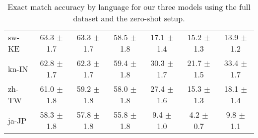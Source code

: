 \documentclass[11pt]{article}
\begin{document}
\begin{table*}[]
{\begin{tabular}{lcccccc}
sw-KE & 63.3 $\pm$ 1.7 & 63.3 $\pm$ 1.7 & 58.5 $\pm$ 1.8 & 17.1 $\pm$ 1.4 & 15.2 $\pm$ 1.3 & 13.9 $\pm$ 1.2 \\
kn-IN & 62.8 $\pm$ 1.7 & 62.3 $\pm$ 1.7 & 59.4 $\pm$ 1.8 & 30.3 $\pm$ 1.7 & 21.7 $\pm$ 1.5 & 33.4 $\pm$ 1.7 \\
zh-TW & 61.0 $\pm$ 1.8 & 59.2 $\pm$ 1.8 & 58.0 $\pm$ 1.8 & 27.4 $\pm$ 1.6 & 15.3 $\pm$ 1.3 & 18.1 $\pm$ 1.4 \\
ja-JP & 58.3 $\pm$ 1.8 & 57.8 $\pm$ 1.8 & 55.8 $\pm$ 1.8 & 9.4 $\pm$ 1.0 & 4.2 $\pm$ 0.7 & 9.8 $\pm$ 1.1 \\
\bottomrule
\end{tabular}
}
\caption{Exact match accuracy by language for our three models using the full dataset and the zero-shot setup.}
\label{tab:all_ex_match}
\end{table*}
\end{document}

